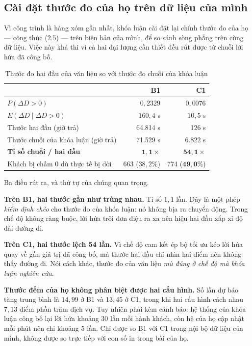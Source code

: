 \subsection{Cài đặt thước đo của họ trên dữ liệu của mình}

Vì công trình \cite{fielbaum2020} là hàng xóm gần nhất, khóa luận cài đặt lại chính thước đo
của họ --- công thức (2.5) --- trên biên bản của mình, để so sánh sòng phẳng trên cùng dữ liệu.
Việc này khả thi vì cả hai đại lượng cần thiết đều rút được từ chuỗi lời hứa đã công bố.

\begin{table}[htbp]
\centering
\caption{Thước đo hai đầu của văn liệu so với thước đo chuỗi của khóa luận}
\label{bang:doichieu}
\small
\begin{tabular}{@{}lrr@{}}
\toprule
& \textbf{B1} & \textbf{C1}\\
\midrule
$P(\Delta D > 0)$ & $0{,}2329$ & $0{,}0076$\\
$E(\Delta D \mid \Delta D > 0)$ & $160{,}4$ s & $10{,}5$ s\\
Thước hai đầu (giờ trả) & 64.814 s & 126 s\\
Thước chuỗi của khóa luận (giờ trả) & 71.529 s & 6.822 s\\
\textbf{Tỉ số chuỗi / hai đầu} & $\mathbf{1{,}1\times}$ & $\mathbf{54{,}1\times}$\\
Khách bị chấm 0 dù thực tế bị dời & 663 ($38{,}2\%$) & 774 ($\mathbf{49{,}0\%}$)\\
\bottomrule
\end{tabular}
\end{table}

Ba điều rút ra, và thứ tự của chúng quan trọng.

\textbf{Trên B1, hai thước gần như trùng nhau.} Tỉ số $1{,}1$ lần. Đây là một phép \emph{kiểm
định chéo} cho thước đo của khóa luận: nó không bịa ra chuyển động. Trong chế độ không ràng buộc,
lời hứa trôi đơn điệu ra xa nên hiệu hai đầu xấp xỉ độ dài đường đi.

\textbf{Trên C1, hai thước lệch 54 lần.} Vì chế độ cam kết ép bộ tối ưu kéo lời hứa quay về gần
giá trị đã công bố, mà thước hai đầu chỉ nhìn hai điểm nên không thấy đường đi. Nói cách khác,
thước đo của văn liệu \emph{mù đúng ở chế độ mà khóa luận nghiên cứu}.

\textbf{Thước đếm của họ không phân biệt được hai cấu hình.} Số lần dự báo tăng trung bình là
$14{,}99$ ở B1 và $13{,}45$ ở C1, trong khi hai cấu hình cách nhau $7{,}13$ điểm phần trăm dịch
vụ. Tuy nhiên phải kèm cảnh báo: hệ thống của khóa luận công bố lại lời hứa khoảng 30 lần mỗi
hành khách, còn hệ của họ cập nhật mỗi phút nên chỉ khoảng 5 lần. Chỉ được so B1 với C1 trong
nội bộ dữ liệu của mình, không được so trực tiếp với con số in trong bài của họ.

